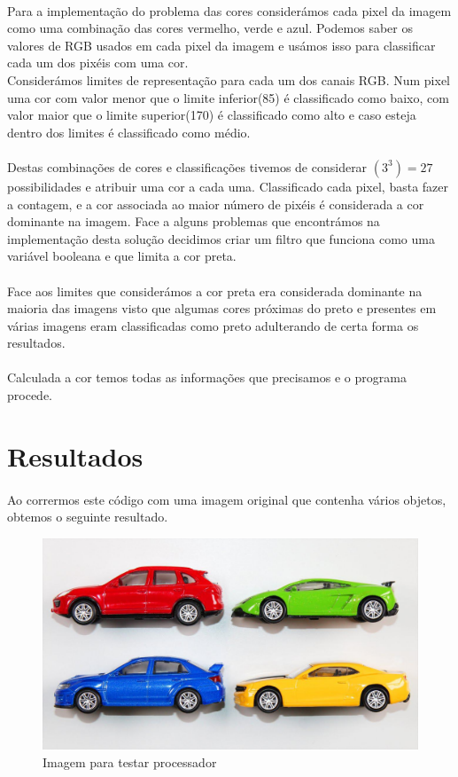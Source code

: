 \documentclass{report}
\begin{document}
\paragraph{}
Para a implementação do problema das cores considerámos cada pixel da imagem como uma
combinação das cores vermelho, verde e azul. Podemos saber os valores de RGB usados em
cada pixel da imagem e usámos isso para classificar cada um dos pixéis com uma cor.
\\
Considerámos limites de representação para cada um dos canais RGB. Num pixel uma cor com
valor menor que o limite inferior(85) é classificado como baixo, com valor maior que o
limite superior(170) é classificado como alto e caso esteja dentro dos limites é classificado
como médio. 
\paragraph{}
Destas combinações de cores e classificações tivemos de considerar $(3^3) = 27$ possibilidades e
atribuir uma cor a cada uma. Classificado cada pixel, basta fazer a contagem, e a cor associada
ao maior número de pixéis é considerada a cor dominante na imagem.
Face a alguns problemas que encontrámos na implementação desta solução decidimos criar
um filtro que funciona como uma variável booleana e que limita a cor preta. 
\paragraph{}
Face aos limites que considerámos a cor preta era considerada dominante na maioria das imagens visto que
algumas cores próximas do preto e presentes em várias imagens eram classificadas como
preto adulterando de certa forma os resultados. 
\paragraph{}
Calculada a cor temos todas as informações que precisamos e o programa procede.


\section{Resultados}
\paragraph{}
Ao corrermos este código com uma imagem original que contenha vários objetos, obtemos o seguinte resultado.

\begin{figure}[H]
\centering
\includegraphics[width=0.75\linewidth]{teste.jpg}
\caption{Imagem para testar processador}
\end{figure}
\end{document}
